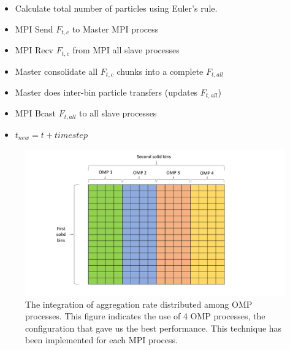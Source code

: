 \documentclass[preprint,11pt,authoryear]{elsarticle}
\begin{document}
\begin{algorithm}[!h]
\begin{algorithmic}[*]
\EndFor
\begin{itemize}[noitemsep,nolistsep,itemindent=20pt]
\item  Calculate total number of particles using Euler's rule. 
\end{itemize}

\EndFor
\begin{itemize}[noitemsep,nolistsep,itemindent=10pt]
\item MPI Send $F_{t,c}$ to Master MPI process
\item MPI Recv $F_{t,c}$ from MPI all slave processes
\item Master consolidate all $F_{t,c}$ chunks into a complete $F_{t,all}$
\item Master does inter-bin particle transfers (updates $F_{t,all}$)
\item MPI Bcast $F_{t,all}$ to all slave processes
\item $t_{new} = t + timestep$
\end{itemize}
\EndWhile   

\end{algorithmic}
\end{algorithm}   
\begin{figure}[H]
\centering
\includegraphics[scale=0.5]{OMP_table.pdf}
\caption{The integration of aggregation rate distributed among OMP processes. This figure indicates the use of 4 OMP processes, the 
configuration that gave us the best performance. This technique has been implemented for each MPI process.}
\label{fig:mthds_OMP_distribution}
\end{figure}	
\end{document}
